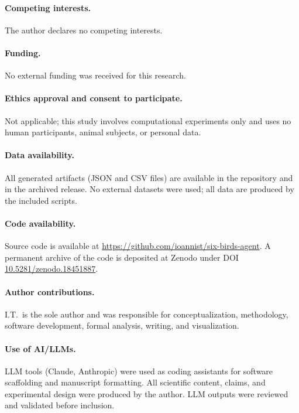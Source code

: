 \documentclass[11pt]{article}
\begin{document}
\paragraph{Competing interests.}
The author declares no competing interests.

\paragraph{Funding.}
No external funding was received for this research.

\paragraph{Ethics approval and consent to participate.}
Not applicable; this study involves computational experiments only and uses no human participants, animal subjects, or personal data.

\paragraph{Data availability.}
All generated artifacts (JSON and CSV files) are available in the repository and in the archived release. No external datasets were used; all data are produced by the included scripts.

\paragraph{Code availability.}
Source code is available at \url{https://github.com/ioannist/six-birds-agent}. A permanent archive of the code is deposited at Zenodo under DOI \href{https://doi.org/10.5281/zenodo.18451887}{10.5281/zenodo.18451887}.

\paragraph{Author contributions.}
I.T.\ is the sole author and was responsible for conceptualization, methodology, software development, formal analysis, writing, and visualization.

\paragraph{Use of AI/LLMs.}
LLM tools (Claude, Anthropic) were used as coding assistants for software scaffolding and manuscript formatting. All scientific content, claims, and experimental design were produced by the author. LLM outputs were reviewed and validated before inclusion.
 
\end{document}
